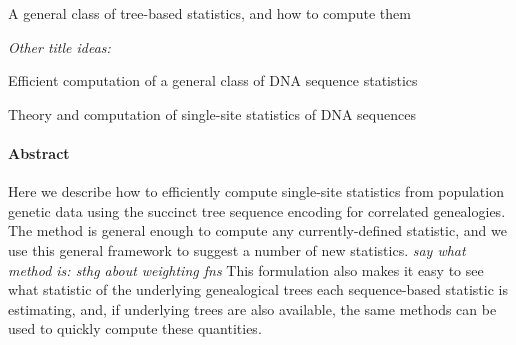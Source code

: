 \documentclass{article}
\newcommand{\plr}[1]{{\color{blue} \it #1}}
\begin{document}
\begin{center}
    A general class of tree-based statistics,
    and how to compute them
\end{center}

\emph{Other title ideas:}

Efficient computation of a general class of DNA sequence statistics

Theory and computation of single-site statistics of DNA sequences


\paragraph{Abstract}
Here we describe how to efficiently compute single-site statistics
from population genetic data using the succinct tree sequence
encoding for correlated genealogies.
The method is general enough to compute any currently-defined statistic,
and we use this general framework to suggest a number of new statistics.
\plr{say what method is: sthg about weighting fns}
This formulation also makes it easy to see what statistic of the underlying genealogical trees
each sequence-based statistic is estimating,
and, if underlying trees are also available,
the same methods can be used to quickly compute these quantities.


%
%
%
%
%
%
%
%
%
\end{document}
